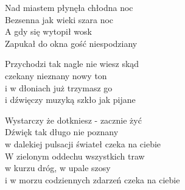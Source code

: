 
\begin{text}
    Nad miastem płynęła chłodna noc\\
    Bezsenna jak wieki szara noc\\
    A gdy się wytopił wosk\\
    Zapukał do okna gość niespodziany

    Przychodzi tak nagle nie wiesz skąd\\
    czekany nieznany nowy ton\\
    i w dłoniach już trzymasz go\\
    i dźwięczy muzyką szkło jak pijane

    Wystarczy że dotkniesz - zacznie żyć\\
    Dźwięk tak długo nie poznany\\
    w dalekiej pulsacji świateł czeka na ciebie\\
    W zielonym oddechu wszystkich traw\\
    w kurzu dróg, w upale szosy\\
    i w morzu codziennych zdarzeń czeka na ciebie
\end{text}
